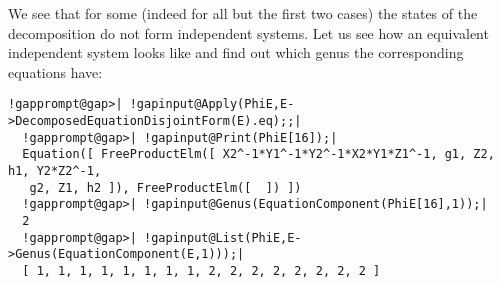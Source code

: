 \documentclass[a4paper,11pt]{report}
\begin{document}
{{\begin{Verbatim}[commandchars=!@|,fontsize=\small,frame=single,label=Example]
\end{Verbatim}
 We see that for some (indeed for all but the first two cases) the states of
the decomposition do not form independent systems. Let us see how an
equivalent independent system looks like and find out which genus the
corresponding equations have: 
\begin{Verbatim}[commandchars=!@|,fontsize=\small,frame=single,label=Example]
  !gapprompt@gap>| !gapinput@Apply(PhiE,E->DecomposedEquationDisjointForm(E).eq);;|
  !gapprompt@gap>| !gapinput@Print(PhiE[16]);|
  Equation([ FreeProductElm([ X2^-1*Y1^-1*Y2^-1*X2*Y1*Z1^-1, g1, Z2, h1, Y2*Z2^-1,
   g2, Z1, h2 ]), FreeProductElm([  ]) ])
  !gapprompt@gap>| !gapinput@Genus(EquationComponent(PhiE[16],1));|
  2
  !gapprompt@gap>| !gapinput@List(PhiE,E->Genus(EquationComponent(E,1)));|
  [ 1, 1, 1, 1, 1, 1, 1, 1, 2, 2, 2, 2, 2, 2, 2, 2 ]
   
\end{Verbatim}
 }


}
\end{document}
